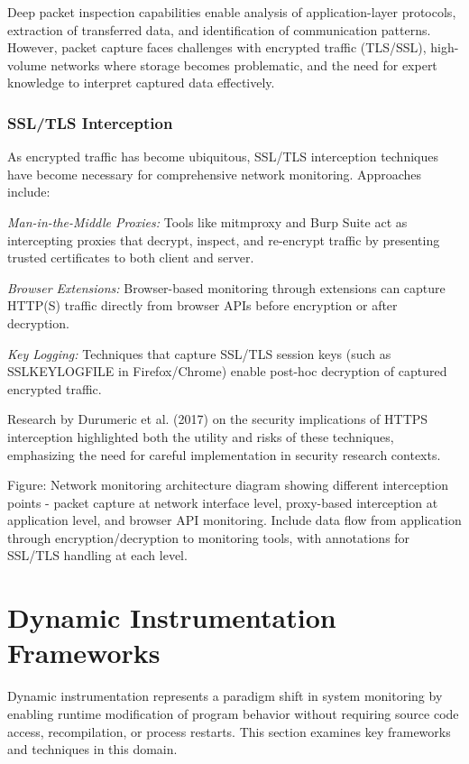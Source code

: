 Deep packet inspection capabilities enable analysis of application-layer protocols, extraction of transferred data, and identification of communication patterns. However, packet capture faces challenges with encrypted traffic (TLS/SSL), high-volume networks where storage becomes problematic, and the need for expert knowledge to interpret captured data effectively.

\subsubsection{SSL/TLS Interception}
As encrypted traffic has become ubiquitous, SSL/TLS interception techniques have become necessary for comprehensive network monitoring. Approaches include:

\textit{Man-in-the-Middle Proxies:} Tools like mitmproxy and Burp Suite act as intercepting proxies that decrypt, inspect, and re-encrypt traffic by presenting trusted certificates to both client and server.

\textit{Browser Extensions:} Browser-based monitoring through extensions can capture HTTP(S) traffic directly from browser APIs before encryption or after decryption.

\textit{Key Logging:} Techniques that capture SSL/TLS session keys (such as SSLKEYLOGFILE in Firefox/Chrome) enable post-hoc decryption of captured encrypted traffic.

Research by Durumeric et al. (2017) on the security implications of HTTPS interception highlighted both the utility and risks of these techniques, emphasizing the need for careful implementation in security research contexts.

{{Figure: Network monitoring architecture diagram showing different interception points - packet capture at network interface level, proxy-based interception at application level, and browser API monitoring. Include data flow from application through encryption/decryption to monitoring tools, with annotations for SSL/TLS handling at each level.}}

\section{Dynamic Instrumentation Frameworks}

Dynamic instrumentation represents a paradigm shift in system monitoring by enabling runtime modification of program behavior without requiring source code access, recompilation, or process restarts. This section examines key frameworks and techniques in this domain.

